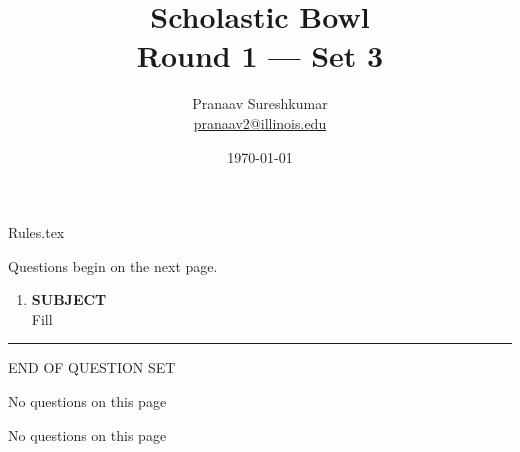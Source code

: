 \documentclass{report}
\title{\textbf{Scholastic Bowl} \\ Round 1 --- Set 3}
\author{Pranaav Sureshkumar \\ \href{mailto:pranaav2@illinois.edu}{pranaav2@illinois.edu}}
\date{\today}
\begin{document}


\maketitle

{Rules.tex}

\newpage

\vspace*{\fill}
\centering
\thispagestyle{empty}
\Large
Questions begin on the next page.
\vspace*{\fill}

\normalsize
\newpage
\setcounter{page}{1}

\begin{enumerate}
    \item \textbf{SUBJECT} \\ Fill
\end{enumerate}


\vspace*{0.5 cm}
\centering
\rule{10 cm}{0.4pt}

\Large
END OF QUESTION SET
\newpage

\vspace*{\fill}
\centering
\thispagestyle{empty}
\Large
No questions on this page
\vspace*{\fill}

\newpage

\vspace*{\fill}
\centering
\thispagestyle{empty}
\Large
No questions on this page
\vspace*{\fill}
\end{document}
